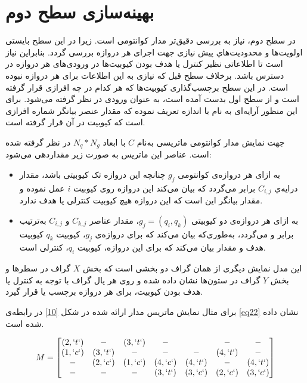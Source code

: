 \section{بهینه‌سازی سطح دوم}

در سطح دوم، نیاز به بررسی دقیق‌تر مدار کوانتومی است. زیرا در این سطح بایستی اولویت‌ها و محدوديت‌هاي پیش نیازی جهت اجرای هر دروازه بررسی گردد. بنابراین نیاز است تا اطلاعاتی نظیر کنترل یا هدف بودن کیوبیت‌ها در ورودی‌های هر دروازه در دسترس باشد. برخلاف سطح قبل که نیازی به این اطلاعات برای هر دروازه نبوده است. در این سطح برچسب‌گذاری کیوبیت‌ها که هر کدام در چه افرازی قرار گرفته است و از سطح اول بدست آمده است، به عنوان ورودی در نظر گرفته می‌شود. برای این منظور آرایه‌ای به نام   با اندازه  تعریف نموده که مقدار عنصر  بیانگر شماره افرازی است که کیوبیت  در آن قرار گرفته است.

جهت نمایش مدار کوانتومی ماتریسی به‌نام $C$ با ابعاد $N_q*N_g$ در نظر گرفته شده است. عناصر این ماتریس به صورت زیر مقداردهی می‌شود:
\begin{itemize}

\item
به ازای هر دروازه‌ی کوانتومی $g_{j}$ چنانچه این دروازه تک کیوبیتی باشد، مقدار درایه‌ي $C_{i,j}$ برابر    می‌گردد که  بیان می‌کند این دروازه روی کیوبیت $i$ عمل نموده و مقدار   بیانگر این است که این دروازه هیچ کیوبیت کنترلی یا هدف ندارد.
\item
به ازای هر دروازه‌ی دو کیوبیتی $g_{j}=(q_{i},q_{k})$، مقدار عناصر $C_{k,j}$ و $C_{i,j}$ به‌ترتیب برابر   و  می‌گردد، به‌طوری‌که   بیان می‌کند که برای دروازه‌ی $g_{j}$، کیوبیت $q_{k}$ کیوبیت هدف و مقدار  بیان می‌کند که برای این دروازه، کیوبیت $q_{i}$،  کنترلی است.
\end{itemize}

این مدل نمایش دیگری از همان گراف دو بخشی است که بخش $X$ گراف در سطرها و بخش $Y$ گراف در ستون‌ها نشان داده شده و روی هر یال گراف با توجه به کنترل یا هدف بودن کیوبیت، برای هر دروازه برچسب  یا   قرار گیرد.

برای مثال نمایش ماتریس مدار ارائه شده در شکل \ref{10} در رابطه‌ی \eqref{eq22} نشان داده شده است.




\begin{equation}
M=
\begin{bmatrix}
(2,`t`)&-&(3,`t`)&-&&-&-\\
(1,`c`)&(3,`t`)&-&-&-&(4,`t`)&-\\
-&(2,`c`)&(1,`c`)&(4,`c`)&(4,`t`)&-&(4,`t`)\\
-&-&-&(3,`t`)&(3,`c`)&(2,`c`)&(3,`c`)\\
\end{bmatrix}
\label{eq22}
\end{equation}



